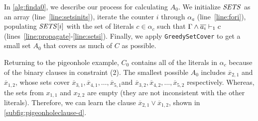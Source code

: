 In \autoref{alg:finda0}, we describe our process for calculating $A_0$. 
We initialize ${\it SETS}$ as an array (line~\ref{line:setsinits}), iterate the counter $i$ through
$\alpha_a$ (line~\ref{line:fori}), populating ${\it SETS}[i]$ with the set of literals $c \in \alpha_c$
such that $\Gamma \land \overline{a_i} \vdash_1 c$ (lines~\ref{line:propagate}-\ref{line:setsi}). Finally, we apply
\texttt{GreedySetCover} to get a small set $A_0$ that covers as much of $C$ as
possible.

Returning to the pigeonhole example, $C_0$ contains all of the literals in
$\alpha_c$ because of the binary clauses in constraint (2). The smallest
possible $A_0$ includes $\overline{x}_{2, 1}$ and $\overline{x}_{1, 2}$, whose
sets cover $\overline{x}_{3, 1}, \overline{x}_{4, 1},  \ldots, \overline{x}_{5,
1}$and  $\overline{x}_{3, 2}, \overline{x}_{4, 2},  \ldots, \overline{x}_{5, 2}$
respectively. Whereas, the sets from $x_{1, 1}$ and $x_{2, 2}$ are empty (they
are not inconsistent with the other literals). Therefore, we can learn the
clause $\overline{x}_{2, 1} \lor \overline{x}_{1, 2}$, shown in
\autoref{subfig:pigeonholeclause-d}.
